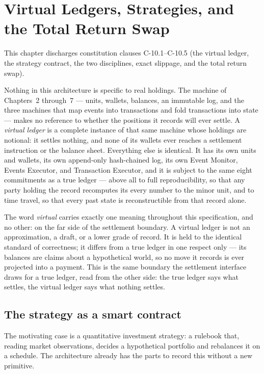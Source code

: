\section{Virtual Ledgers, Strategies, and the Total Return Swap}
\label{ch:virtual}

This chapter discharges constitution clauses C-10.1--C-10.5 (the virtual ledger, the strategy contract, the two disciplines, exact slippage, and the total return swap).

Nothing in this architecture is specific to real holdings. The machine of
Chapters~2 through~7 --- units, wallets, balances, an immutable log, and the
three machines that map events into transactions and fold transactions into
state --- makes no reference to whether the positions it records will ever
settle. A \emph{virtual ledger} is a complete instance of that same machine
whose holdings are notional: it settles nothing, and none of its wallets ever
reaches a settlement instruction or the balance sheet. Everything else is
identical. It has its own units and wallets, its own append-only hash-chained
log, its own Event Monitor, Events Executor, and Transaction Executor, and it is
subject to the same eight commitments as a true ledger --- above all to full
reproducibility, so that any party holding the record recomputes its every
number to the minor unit, and to time travel, so that every past state is
reconstructible from that record alone.

The word \emph{virtual} carries exactly one meaning throughout this
specification, and no other: on the far side of the settlement boundary. A
virtual ledger is not an approximation, a draft, or a lower grade of record. It
is held to the identical standard of correctness; it differs from a true ledger
in one respect only --- its balances are claims about a hypothetical world, so
no move it records is ever projected into a payment. This is the same boundary
the settlement interface draws for a true ledger, read from the other side: the
true ledger says what settles, the virtual ledger says what nothing settles.

\subsection{The strategy as a smart contract}

The motivating case is a quantitative investment strategy: a rulebook that,
reading market observations, decides a hypothetical portfolio and rebalances it
on a schedule. The architecture already has the parts to record this without a
new primitive.


